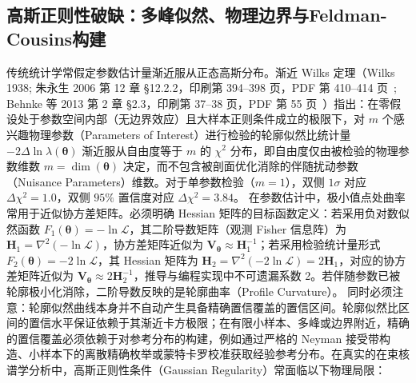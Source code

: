 \subsection{高斯正则性破缺：多峰似然、物理边界与Feldman-Cousins构建}\label{subsec:5-10-3}

传统统计学常假定参数估计量渐近服从正态高斯分布。渐近 Wilks 定理（Wilks 1938; 朱永生 2006 第 12 章 §12.2.2，印刷第 394--398 页，PDF 第 410--414 页~\cite{book-zhu-probability-statistics-in-physics}; Behnke 等 2013 第 2 章 §2.3，印刷第 37--38 页，PDF 第 55 页~\cite{book-behnke-data-analysis-hep}）指出：在零假设处于参数空间内部（无边界效应）且大样本正则条件成立的极限下，对 $m$ 个感兴趣物理参数（Parameters of Interest）进行检验的轮廓似然比统计量 $-2\Delta\ln\lambda(\boldsymbol{\theta})$ 渐近服从自由度等于 $m$ 的 $\chi^2$ 分布，即自由度仅由被检验的物理参数维数 $m = \dim(\boldsymbol{\theta})$ 决定，而不包含被剖面优化消除的伴随扰动参数（Nuisance Parameters）维数。对于单参数检验（$m=1$），双侧 $1\sigma$ 对应 $\Delta\chi^2 = 1.0$，双侧 $95\%$ 置信度对应 $\Delta\chi^2 = 3.84$。
在参数估计中，极小值点处曲率常用于近似协方差矩阵。必须明确 Hessian 矩阵的目标函数定义：若采用负对数似然函数 $F_1(\boldsymbol{\theta}) = -\ln\mathcal{L}$，其二阶导数矩阵（观测 Fisher 信息阵）为 $\mathbf{H}_1 = \nabla^2(-\ln\mathcal{L})$，协方差矩阵近似为 $\mathbf{V}_{\boldsymbol{\theta}} \approx \mathbf{H}_1^{-1}$；若采用检验统计量形式 $F_2(\boldsymbol{\theta}) = -2\ln\mathcal{L}$，其 Hessian 矩阵为 $\mathbf{H}_2 = \nabla^2(-2\ln\mathcal{L}) = 2\mathbf{H}_1$，对应的协方差矩阵近似为 $\mathbf{V}_{\boldsymbol{\theta}} \approx 2 \mathbf{H}_2^{-1}$，推导与编程实现中不可遗漏系数 2。若伴随参数已被轮廓极小化消除，二阶导数反映的是轮廓曲率（Profile Curvature）。
同时必须注意：轮廓似然曲线本身并不自动产生具备精确置信覆盖的置信区间。轮廓似然比区间的置信水平保证依赖于其渐近卡方极限；在有限小样本、多峰或边界附近，精确的置信覆盖必须依赖于对参考分布的构建，例如通过严格的 Neyman 接受带构造、小样本下的离散精确枚举或蒙特卡罗校准获取经验参考分布。在真实的在束核谱学分析中，高斯正则性条件（Gaussian Regularity）常面临以下物理局限：
